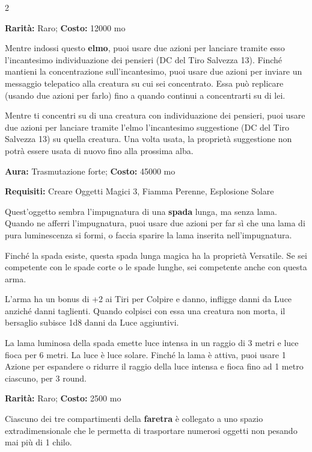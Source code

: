 \begin{multicols}{2}

\textbf{Rarità:} Raro; \textbf{Costo:} 12000 mo

Mentre indossi questo \textbf{elmo}, puoi usare due azioni per lanciare tramite esso l'incantesimo individuazione dei pensieri (DC del Tiro Salvezza 13). Finché mantieni la concentrazione sull'incantesimo, puoi usare due azioni per inviare un messaggio telepatico alla creatura su cui sei concentrato. Essa può replicare (usando due azioni per farlo) fino a quando continui a concentrarti su di lei.

Mentre ti concentri su di una creatura con individuazione dei pensieri, puoi usare due azioni per lanciare tramite l'elmo l'incantesimo suggestione (DC del Tiro Salvezza 13) su quella creatura. Una volta usata, la proprietà suggestione non potrà essere usata di nuovo fino alla prossima alba.


\textbf{Aura:} Trasmutazione forte; \textbf{Costo:} 45000 mo

\textbf{Requisiti:} Creare Oggetti Magici 3, Fiamma Perenne, Esplosione Solare

Quest'oggetto sembra l'impugnatura di una \textbf{spada} lunga, ma senza lama. Quando ne afferri l'impugnatura, puoi usare due azioni per far sì che una lama di pura luminescenza si formi, o faccia sparire la lama inserita nell'impugnatura.

Finché la spada esiste, questa spada lunga magica ha la proprietà Versatile. Se sei competente con le spade corte o le spade lunghe, sei competente anche con questa arma.

L'arma ha un bonus di +2 ai Tiri per Colpire e danno, infligge danni da Luce anziché danni taglienti. Quando colpisci con essa una creatura non morta, il bersaglio subisce 1d8 danni da Luce aggiuntivi.

La lama luminosa della spada emette luce intensa in un raggio di 3 metri e luce fioca per 6 metri. La luce è luce solare. Finché la lama è attiva, puoi usare 1 Azione per espandere o ridurre il raggio della luce intensa e fioca fino ad 1 metro ciascuno, per 3 round.


\textbf{Rarità:} Raro; \textbf{Costo:} 2500 mo

Ciascuno dei tre compartimenti della \textbf{faretra} è collegato a uno spazio extradimensionale che le permetta di trasportare numerosi oggetti non pesando mai più di 1 chilo.


\end{multicols}
